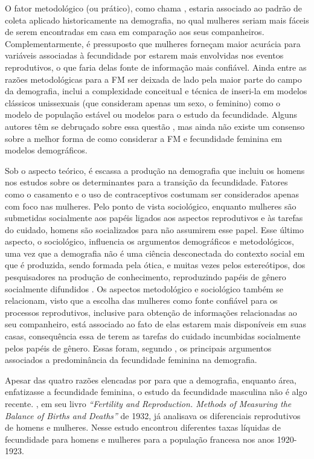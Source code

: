 O fator metodológico (ou prático), como chama , estaria associado ao padrão de coleta aplicado historicamente na demografia, no qual mulheres seriam mais fáceis de serem encontradas em casa em comparação aos seus companheiros. Complementarmente, é pressuposto que mulheres forneçam maior acurácia para variáveis associadas à fecundidade por estarem mais envolvidas nos eventos reprodutivos, o que faria delas fonte de informação mais confiável. Ainda entre as razões metodológicas para a FM ser deixada de lado pela maior parte do campo da demografia,  inclui a complexidade conceitual e técnica de inseri-la em modelos clássicos unissexuais (que consideram apenas um sexo, o feminino) como o modelo de população estável ou modelos para o estudo da fecundidade. Alguns autores têm se debruçado sobre essa questão \cite{li2022two,shyu2018mating,caswell2022formal}, mas ainda não existe um consenso sobre a melhor forma de como considerar a FM e fecundidade feminina em modelos demográficos.   


Sob o aspecto teórico, é escassa a produção na demografia que incluiu os homens nos estudos sobre os determinantes para a transição da fecundidade. Fatores como o casamento e o uso de contraceptivos costumam ser considerados apenas com foco nas mulheres. Pelo ponto de vista sociológico, enquanto mulheres são submetidas socialmente aos papéis ligados aos aspectos reprodutivos e às tarefas do cuidado, homens são socializados para não assumirem esse papel. Esse último aspecto, o sociológico, influencia os argumentos demográficos e metodológicos, uma vez que a demografia não é uma ciência desconectada do contexto social em que é produzida, sendo formada pela ótica, e muitas vezes pelos estereótipos, dos pesquisadores na produção de conhecimento, reproduzindo papéis de gênero socialmente difundidos \cite{watkins1993if}. Os aspectos metodológico e sociológico também se relacionam, visto que a escolha das mulheres como fonte confiável para os processos reprodutivos, inclusive para obtenção de informações relacionadas ao seu companheiro, está associado ao fato de elas estarem mais disponíveis em suas casas, consequência essa de terem as tarefas do cuidado incumbidas socialmente pelos papéis de gênero. Essas foram, segundo , os principais argumentos associados a predominância da fecundidade feminina na demografia. 

Apesar das quatro razões elencadas por  para que a demografia, enquanto área, enfatizasse a fecundidade feminina, o estudo da fecundidade masculina não é algo recente. , em seu livro \textit{“Fertility and Reproduction. Methods of Measuring the Balance of Births and Deaths”} de 1932, já analisava os diferenciais reprodutivos de homens e mulheres. Nesse estudo encontrou diferentes taxas líquidas de fecundidade para homens e mulheres para a população francesa nos anos 1920-1923. 

